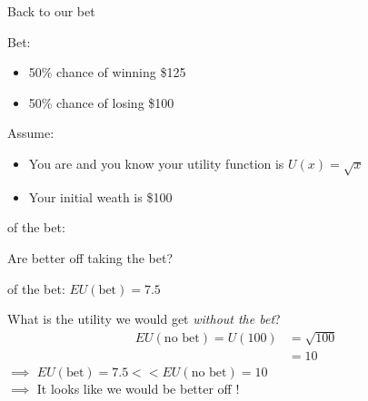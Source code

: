 \begin{frame}{Back to our bet}

    Bet: 
    \begin{itemize}
        \item 50\% chance of winning \$125
        \item 50\% chance of losing \$100
    \end{itemize}  
    \vspace{5mm}

    Assume:
    \begin{itemize}
        \item You are  and you know your utility function is $U(x) = \sqrt{x}$
        \item Your initial weath is \$100
    \end{itemize}
    \vspace{3mm}
     of the bet:
\end{frame}
\begin{frame}{Are better off taking the bet?}

     of the bet: $EU(\text{bet})=7.5$
    \vspace{5mm}

    What is the utility we would get \textit{without the bet}?
    \begin{align*}
        EU(\text{no bet}) = U(100) &= \sqrt{100}\\
        &= 10 
    \end{align*}
    $\implies$ $EU(\text{bet}) = 7.5 << EU(\text{no bet}) = 10$\\
    $\implies$ It looks like we would be better off !

\end{frame}
